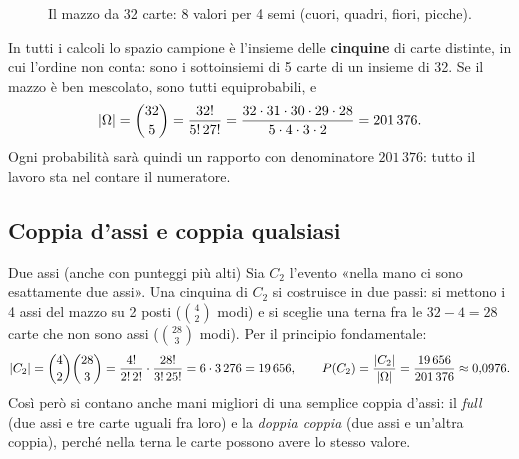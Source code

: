\begin{figure}[H]
\centering
{}
\caption{Il mazzo da 32 carte: 8 valori per 4 semi (cuori, quadri, fiori, picche).}
\end{figure}

In tutti i calcoli lo spazio campione è l'insieme delle \textbf{cinquine} di carte distinte, in cui l'ordine non
conta: sono i sottoinsiemi di 5 carte di un insieme di 32. Se il mazzo è ben mescolato, sono tutti equiprobabili, e
\[ \left\lvert \Omega \right\rvert = \binom{32}{5} = \frac{32!}{5!\,27!} = \frac{32 \cdot 31 \cdot 30 \cdot 29 \cdot 28}{5 \cdot 4 \cdot
   3 \cdot 2} = 201\,376 . \]
Ogni probabilità sarà quindi un rapporto con denominatore $201\,376$: tutto il lavoro sta nel contare il numeratore.

\subsection{Coppia d'assi e coppia qualsiasi}

\begin{esempio}{Due assi (anche con punteggi più alti)}
Sia $C_2$ l'evento «nella mano ci sono esattamente due assi». Una cinquina di $C_2$ si costruisce in due passi:
si mettono i 4 assi del mazzo su 2 posti ($\binom{4}{2}$ modi) e si sceglie una terna fra le $32 - 4 = 28$ carte che
non sono assi ($\binom{28}{3}$ modi). Per il principio fondamentale:
\[
  \left\lvert C_2 \right\rvert = \binom{4}{2}\binom{28}{3} = \frac{4!}{2!\,2!} \cdot \frac{28!}{3!\,25!} = 6 \cdot 3\,276 = 19\,656 ,
  \qquad
  P(C_2) = \frac{\left\lvert C_2 \right\rvert}{\left\lvert \Omega \right\rvert} = \frac{19\,656}{201\,376} \approx 0{,}0976 .
\]
Così però si contano anche mani migliori di una semplice coppia d'assi: il \emph{full} (due assi e tre carte uguali
fra loro) e la \emph{doppia coppia} (due assi e un'altra coppia), perché nella terna le carte possono avere lo stesso
valore.
\end{esempio}

